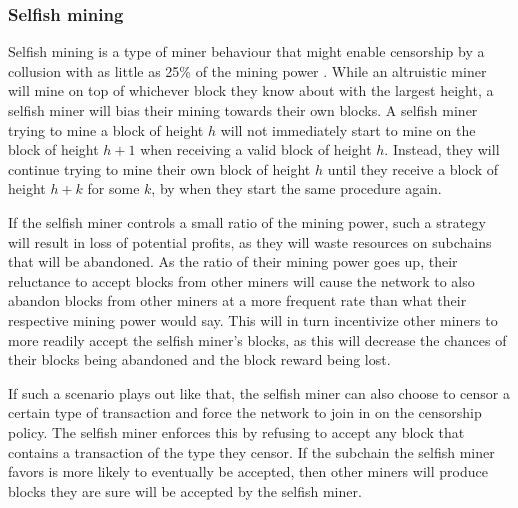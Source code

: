 \subsubsection{Selfish mining}
Selfish mining is a type of miner behaviour that might enable censorship by a collusion with as little as 25\% of the mining power \cite{eyal_majority_2018}. While an altruistic miner will mine on top of whichever block they know about with the largest height, a selfish miner will bias their mining towards their own blocks. A selfish miner trying to mine a block of height $h$ will not immediately start to mine on the block of height $h+1$ when receiving a valid block of height $h$. Instead, they will continue trying to mine their own block of height $h$ until they receive a block of height $h+k$ for some $k$, by when they start the same procedure again.

If the selfish miner controls a small ratio of the mining power, such a strategy will result in loss of potential profits, as they will waste resources on subchains that will be abandoned. As the ratio of their mining power goes up, their reluctance to accept blocks from other miners will cause the network to also abandon blocks from other miners at a more frequent rate than what their respective mining power would say. This will in turn incentivize other miners to more readily accept the selfish miner's blocks, as this will decrease the chances of their blocks being abandoned and the block reward being lost.

If such a scenario plays out like that, the selfish miner can also choose to censor a certain type of transaction and force the network to join in on the censorship policy. The selfish miner enforces this by refusing to accept any block that contains a transaction of the type they censor. If the subchain the selfish miner favors is more likely to eventually be accepted, then other miners will produce blocks they are sure will be accepted by the selfish miner.
